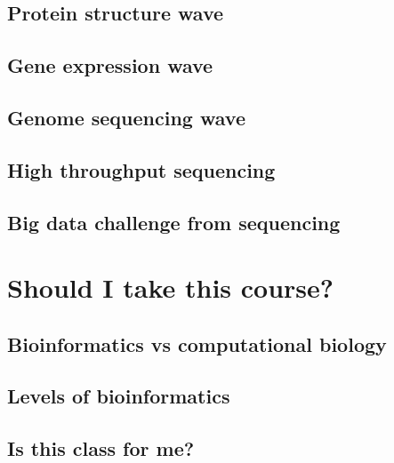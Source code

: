 \documentclass[]{book}
\begin{document}
\hypertarget{protein-structure-wave}{%
\subsection{Protein structure wave}\label{protein-structure-wave}}

\hypertarget{gene-expression-wave}{%
\subsection{Gene expression wave}\label{gene-expression-wave}}

\hypertarget{genome-sequencing-wave}{%
\subsection{Genome sequencing wave}\label{genome-sequencing-wave}}

\hypertarget{high-throughput-sequencing}{%
\subsection{High throughput sequencing}\label{high-throughput-sequencing}}

\hypertarget{big-data-challenge-from-sequencing}{%
\subsection{Big data challenge from sequencing}\label{big-data-challenge-from-sequencing}}

\hypertarget{should-i-take-this-course}{%
\section{Should I take this course?}\label{should-i-take-this-course}}

\hypertarget{bioinformatics-vs-computational-biology}{%
\subsection{Bioinformatics vs computational biology}\label{bioinformatics-vs-computational-biology}}

\hypertarget{levels-of-bioinformatics}{%
\subsection{Levels of bioinformatics}\label{levels-of-bioinformatics}}

\hypertarget{is-this-class-for-me}{%
\subsection{Is this class for me?}\label{is-this-class-for-me}}
\end{document}
